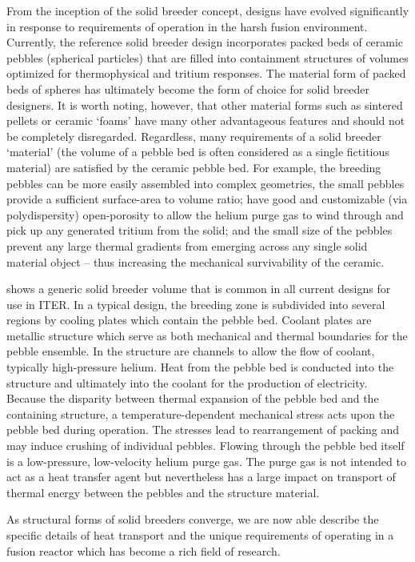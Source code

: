 From the inception of the solid breeder concept, designs have evolved significantly in response to requirements of operation in the harsh fusion environment. Currently, the reference solid breeder design incorporates packed beds of ceramic pebbles (spherical particles) that are filled into containment structures of volumes optimized for thermophysical and tritium responses. The material form of packed beds of spheres has ultimately become the form of choice for solid breeder designers. It is worth noting, however, that other material forms such as sintered pellets or ceramic `foams' have many other advantageous features and should not be completely disregarded. Regardless, many requirements of a solid breeder `material' (the volume of a pebble bed is often considered as a single fictitious material) are satisfied by the ceramic pebble bed. For example, the breeding pebbles can be more easily assembled into complex geometries, the small pebbles provide a sufficient surface-area to volume ratio; have good and customizable (via polydispersity) open-porosity to allow the helium purge gas to wind through and pick up any generated tritium from the solid; and the small size of the pebbles prevent any large thermal gradients from emerging across any single solid material object -- thus increasing the mechanical survivability of the ceramic.

 shows a generic solid breeder volume that is common in all current designs for use in ITER. In a typical design, the breeding zone is subdivided into several regions by cooling plates which contain the pebble bed. Coolant plates are metallic structure which serve as both mechanical and thermal boundaries for the pebble ensemble. In the structure are channels to allow the flow of coolant, typically high-pressure helium. Heat from the pebble bed is conducted into the structure and ultimately into the coolant for the production of electricity. Because the disparity between thermal expansion of the pebble bed and the containing structure, a temperature-dependent mechanical stress acts upon the pebble bed during operation. The stresses lead to rearrangement of packing and may induce crushing of individual pebbles. Flowing through the pebble bed itself is a low-pressure, low-velocity helium purge gas. The purge gas is not intended to act as a heat transfer agent but nevertheless has a large impact on transport of thermal energy between the pebbles and the structure material.

As structural forms of solid breeders converge, we are now able describe the specific details of heat transport and the unique requirements of operating in a fusion reactor which has become a rich field of research.

